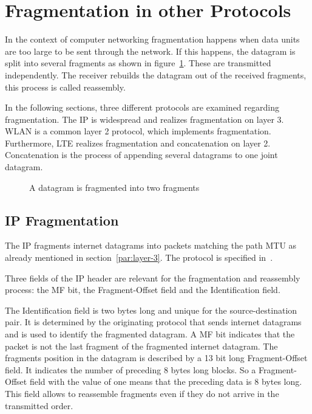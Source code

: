 \section{Fragmentation in other Protocols}
\label{ch:fragmentation}
In the context of computer networking fragmentation happens when data units are too large to be sent through the network.
If this happens, the datagram is split into several fragments as shown in figure~\ref{fig:fragmentation}.
These are transmitted independently.
The receiver rebuilds the datagram out of the received fragments, this process is called reassembly.

In the following sections, three different protocols are examined regarding fragmentation.
The \gls{IP} is widespread and realizes fragmentation on layer 3.
\gls{WLAN} is a common layer 2 protocol, which implements fragmentation.
Furthermore, \gls{LTE} realizes fragmentation and concatenation on layer 2.
Concatenation is the process of appending several datagrams to one joint datagram.

\begin{figure}
    \centering
    \def\svgwidth{0.5\columnwidth}
    
    \caption[Datagram Fragmentation]{A datagram is fragmented into two fragments}
    \label{fig:fragmentation}
\end{figure}
\pagebreak
\subsection{\acrlong{IP} Fragmentation}
\label{sec:ip-fragmentation}
The \gls{IP} fragments internet datagrams into packets matching the path \gls{MTU} as already mentioned in section~\ref{par:layer-3}.
The protocol is specified in~\cite{rfc791}.

Three fields of the \gls{IP} header are relevant for the fragmentation and reassembly process: the \gls{MF} bit, the Fragment-Offset field and the Identification field.

The Identification field is two bytes long and unique for the source-destination pair.
It is determined by the originating protocol that sends internet datagrams and is used to identify the fragmented datagram.
A \gls{MF} bit indicates that the packet is not the last fragment of the fragmented internet datagram.
The fragments position in the datagram is described by a 13 bit long Fragment-Offset field.
It indicates the number of preceding 8 bytes long blocks.
So a Fragment-Offset field with the value of one means that the preceding data is 8 bytes long.
This field allows to reassemble fragments even if they do not arrive in the transmitted order.

